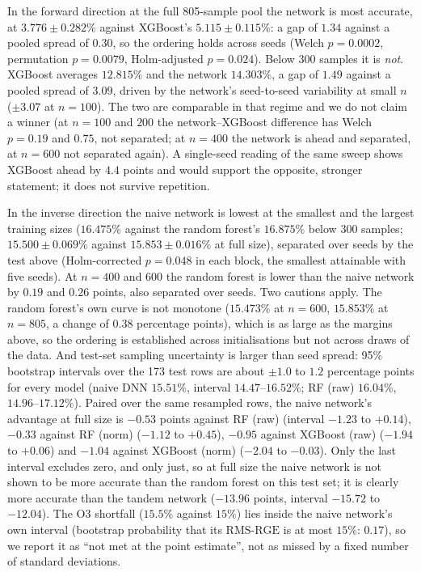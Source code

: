 \documentclass[11pt]{article}
\newcommand{\rge}{\mathrm{RMS\text{-}RGE}}
\begin{document}
In the forward direction at the full 805-sample pool the network is most
accurate, at $3.776 \pm 0.282\%$ against XGBoost's $5.115 \pm 0.115\%$: a gap
of $1.34$ against a pooled spread of $0.30$, so the ordering holds across seeds (Welch $p=0.0002$, permutation $p=0.0079$, Holm-adjusted $p=0.024$). Below
300 samples it is \emph{not}. XGBoost averages $12.815\%$ and the network
$14.303\%$, a gap of $1.49$ against a pooled spread of $3.09$, driven by the
network's seed-to-seed variability at small $n$ ($\pm 3.07$ at $n = 100$).
The two are comparable in that regime and we do not claim a winner (at $n=100$ and $200$ the network--XGBoost difference has Welch $p=0.19$ and $0.75$, not separated; at $n=400$ the network is ahead and separated, at $n=600$ not separated again). A
single-seed reading of the same sweep shows XGBoost ahead by $4.4$ points and
would support the opposite, stronger statement; it does not survive repetition.

In the inverse direction the naive network is lowest at the smallest and the largest training sizes ($16.475\%$ against the random forest's $16.875\%$ below 300 samples; $15.500 \pm 0.069\%$ against $15.853 \pm 0.016\%$ at full size), separated over seeds by the test above (Holm-corrected $p=0.048$ in each block, the smallest attainable with five seeds). At $n=400$ and $600$ the random forest is lower than the naive network by $0.19$ and $0.26$ points, also separated over seeds. Two cautions apply. The random forest's own curve is not monotone ($15.473\%$ at $n = 600$, $15.853\%$ at $n = 805$, a change of $0.38$ percentage points), which is as large as the margins above, so the ordering is established across initialisations but not across draws of the data. And test-set sampling uncertainty is larger than seed spread: 95\% bootstrap intervals over the 173 test rows are about $\pm 1.0$ to $1.2$ percentage points for every model (naive DNN $15.51\%$, interval $14.47$--$16.52\%$; RF (raw) $16.04\%$, $14.96$--$17.12\%$). Paired over the same resampled rows, the naive network's advantage at full size is $-0.53$ points against RF (raw) (interval $-1.23$ to $+0.14$), $-0.33$ against RF (norm) ($-1.12$ to $+0.45$), $-0.95$ against XGBoost (raw) ($-1.94$ to $+0.06$) and $-1.04$ against XGBoost (norm) ($-2.04$ to $-0.03$). Only the last interval excludes zero, and only just, so at full size the naive network is not shown to be more accurate than the random forest on this test set; it is clearly more accurate than the tandem network ($-13.96$ points, interval $-15.72$ to $-12.04$). The O3 shortfall ($15.5\%$ against $15\%$) lies inside the naive network's own interval (bootstrap probability that its $\rge$ is at most $15\%$: $0.17$), so we report it as ``not met at the point estimate'', not as missed by a fixed number of standard deviations.
\end{document}
